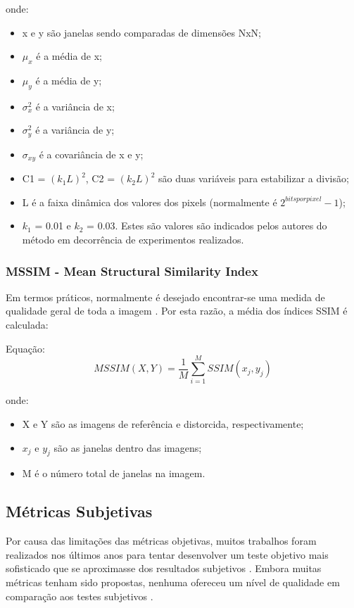 onde:
\begin{itemize}
	\item x e y são janelas sendo comparadas de dimensões NxN;
	\item \(\mu_{x}\) é a média de x;
    \item \(\mu_{y}\) é  a média de y;
    \item \(\sigma^{2}_{x}\) é a variância de x;
    \item \(\sigma^{2}_{y}\) é a variância de y;
    \item \(\sigma_{xy}\) é a covariância de x e y;
    \item C1 = \((k_{1}L)^{2}\), C2 = \((k_{2}L)^{2}\) são duas variáveis para estabilizar a divisão;
    \item L é a faixa dinâmica dos valores dos pixels (normalmente é \(2^{bits por pixel} - 1\));
    \item \(k_{1}\) = 0.01 e \(k_{2}\) = 0.03. Estes são valores são indicados pelos autores do método \cite{wangbovik2004} em decorrência de experimentos realizados.
\end{itemize}

\subsubsection[MSSIM]{MSSIM - Mean Structural Similarity Index}

Em termos práticos, normalmente é desejado encontrar-se uma medida de qualidade geral de toda a imagem \cite{wangbovik2004}. Por esta razão, a média dos índices SSIM é calculada:

Equação: \[MSSIM(X, Y) = \frac{1}{M} \sum_{i=1}^{M} SSIM(x_{j}, y_{j})\]

onde:
\begin{itemize}
	\item X e Y são as imagens de referência e distorcida, respectivamente;
	\item \(x_{j}\) e \(y_{j}\) são as janelas dentro das imagens;
	\item M é o número total de janelas na imagem.
\end{itemize}

\subsection{Métricas Subjetivas}

Por causa das limitações das métricas objetivas, muitos trabalhos foram realizados nos últimos anos para tentar desenvolver um teste objetivo mais sofisticado que se aproximasse dos resultados subjetivos \cite{watson1999, wangbovik2004}. Embora muitas métricas tenham sido propostas, nenhuma ofereceu um nível de qualidade em comparação aos testes subjetivos \cite{vqeg2003}.

